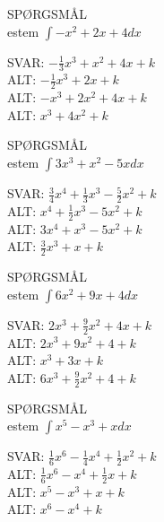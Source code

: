 \documentclass[]{article}
\newcounter{spgcounter}
\newenvironment{question}[2]{\addtocounter{spgcounter}{1} SPØRGSMÅL \thespgcounter\\}{\hspace{50px}}
\newcommand{\answer}[1]{{\color{green} SVAR: #1}\\}
\newcommand{\alt}[1]{{\color{red} ALT: #1}\\}
\begin{document}
\begin{question}{multi}

Bestem $\int{-x^2 + 2x + 4} dx$

\answer{$-\frac{1}{3}x^3 + x^2 + 4x + k$}
\alt{$-\frac{1}{2}x^3 + 2x + k$}
\alt{$-x^3 + 2x^2 + 4x + k$}
\alt{$x^3 + 4x^2 + k$}

\end{question}

\begin{question}{multi}

Bestem $\int{3x^3 + x^2 - 5x} dx$

\answer{$\frac{3}{4}x^4 + \frac{1}{3}x^3 - \frac{5}{2}x^2 + k$}
\alt{$x^4 + \frac{1}{2}x^3 - 5x^2 + k$}
\alt{$3x^4 + x^3 - 5x^2 + k$}
\alt{$\frac{3}{2}x^3 + x + k$}

\end{question}

\begin{question}{multi}

Bestem $\int{6x^2 + 9x + 4} dx$

\answer{$2x^3 + \frac{9}{2}x^2 + 4x + k$}
\alt{$2x^3 + 9x^2 + 4 + k$}
\alt{$x^3 + 3x + k$}
\alt{$6x^3 + \frac{9}{2}x^2 + 4 + k$}

\end{question}

\begin{question}{multi}

Bestem $\int{x^5 - x^3 + x} dx$

\answer{$\frac{1}{6}x^6 - \frac{1}{4}x^4 + \frac{1}{2}x^2 + k$}
\alt{$\frac{1}{6}x^6 - x^4 + \frac{1}{2}x + k$}
\alt{$x^5 - x^3 + x + k$}
\alt{$x^6 - x^4 + k$}

\end{question}
\end{document}
